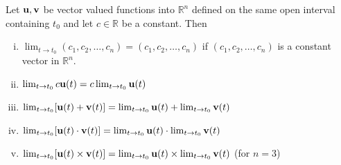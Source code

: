 \documentclass[12pt,letterpaper,reqno]{article}
\numberwithin{equation}{section}
\newcommand{\R}{\ensuremath{\mathbb R}}
\newcommand{\bu}{{\bf u}}
\newcommand{\bv}{{\bf v}}
\begin{document}
{\begin{thm}\label{thm:limit_laws_for_vector-valued_functions}
	Let $\bu, \bv$ be vector valued functions into $\R^n$ defined on the same open interval containing $t_0$ and let $c \in \R$ be a constant. Then
	\begin{enumerate}[(i)]
		\item $\lim_{t \to t_0}(c_1,c_2,\dots,c_n)=(c_1,c_2,\dots,c_n)$ if $(c_1,c_2,\dots,c_n)$ is a constant vector in $\R^n$.
		\item $\lim_{t \to t_0}c\bu(t)=c\lim_{t \to t_0}\bu(t)$
		\item $\lim_{t \to t_0}[\bu(t)+\bv(t)]=\lim_{t \to t_0}\bu(t)+\lim_{t \to t_0}\bv(t)$
		\item $\lim_{t \to t_0}[\bu(t)\cdot\bv(t)]=\lim_{t \to t_0}\bu(t)\cdot\lim_{t \to t_0}\bv(t)$
		\item $\lim_{t \to t_0}[\bu(t)\times\bv(t)]=\lim_{t \to t_0}\bu(t)\times\lim_{t \to t_0}\bv(t)$ (for $n=3$)
	\end{enumerate}
\end{thm}

}
\end{document}
